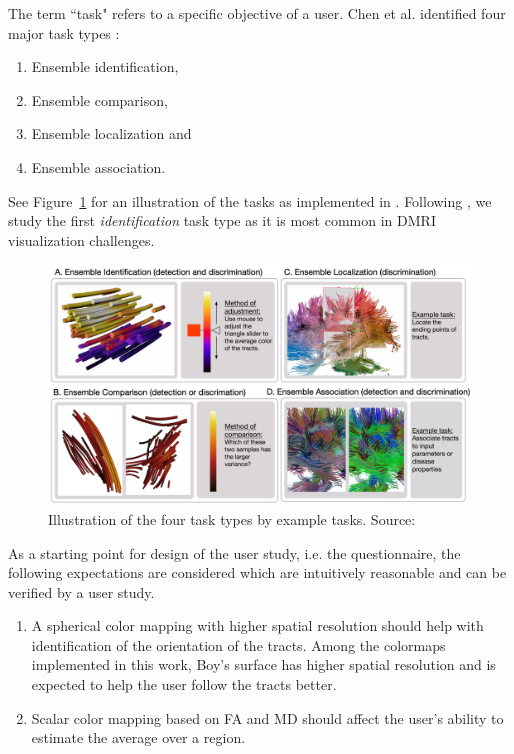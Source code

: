 \documentclass[a4paper, 12pt]{report}
\begin{document}
The term ``task" refers to a specific objective of a user. Chen et al. \cite{chen} identified four major task types : 
\begin{enumerate}
	\item Ensemble identification, 
	\item Ensemble comparison, 
	\item Ensemble localization and
	\item Ensemble association.
\end{enumerate}
See Figure~\ref{fig:task-types} for an illustration of the tasks as implemented in \cite{chen}. Following \cite{chen}, we study the first \emph{identification} task type as it is most common in DMRI visualization challenges. 

\begin{figure}[ht]
    \centering
    \includegraphics[width = 0.9\columnwidth]{task-types}
    \caption{Illustration of the four task types by example tasks. Source:  \cite{chen}}
    \label{fig:task-types}
\end{figure}

As a starting point for design of the user study, i.e. the questionnaire, the following expectations are considered which are intuitively reasonable and can be verified by a user study.
\begin{enumerate}
	\item A spherical color mapping with higher spatial resolution should help with identification of the orientation of the tracts. Among the colormaps implemented in this work, Boy's surface has higher spatial resolution and is expected to help the user follow the tracts better.
	\item Scalar color mapping based on FA and MD should affect the user's ability to estimate the average over a region.
\end{enumerate}
\end{document}
